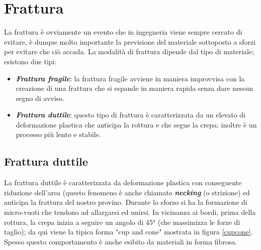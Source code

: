 \newpage

\section{Frattura}

La frattura è ovviamente un evento che in ingegneria viene sempre cercato di evitare, è dunque molto importante la previsione del materiale sottoposto a sforzi per evitare che ciò accada. La modalità di frattura dipende dal tipo di materiale; esistono due tipi:
\begin{itemize}
    \item \textbf{\textit{Frattura fragile}}: la frattura fragile avviene in maniera improvvisa con la creazione di una frattura che si espande in maniera rapida senza dare nessun segno di avviso.
    \item \textbf{\textit{Frattura duttile}}: questo tipo di frattura è caratterizzata da un elevato di deformazione plastica che anticipa la rottura e che segue la crepa; inoltre è un processo più lento e stabile.
\end{itemize}

\subsection{Frattura duttile}

La frattura duttile è caratterizzata da deformazione plastica con conseguente riduzione dell'area (questo fenomeno è anche chiamato \textbf{\textit{necking}} (o strizione) ed anticipa la frattura del nostro provino. Durante lo sforzo si ha la formazione di micro-vuoti che tendono ad allargarsi ed unirsi. 
In vicinanza ai bordi, prima della rottura, la crepa inizia a seguire un angolo di 45° (che massimizza le forze di taglio); da qui viene la tipica forma "cup and cone" mostrata in figura \ref{cupcone}. Spesso questo comportamento è anche esibito da materiali in forma fibrosa.

